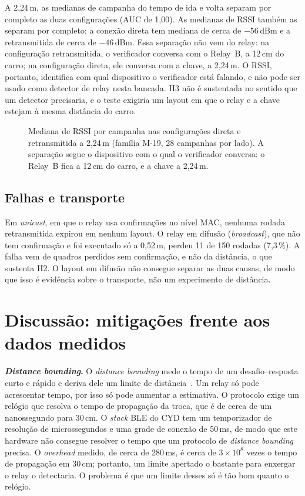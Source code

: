 \documentclass{ieeeaccess}
\begin{document}
A 2,24\,m, as medianas de campanha do tempo de ida e volta separam por completo as duas configurações (AUC de 1,00). As medianas de RSSI também as separam por completo: a conexão direta tem mediana de cerca de $-56$\,dBm e a retransmitida de cerca de $-46$\,dBm. Essa separação não vem do relay: na configuração retransmitida, o verificador conversa com o Relay~B, a 12\,cm do carro; na configuração direta, ele conversa com a chave, a 2,24\,m. O RSSI, portanto, identifica com qual dispositivo o verificador está falando, e não pode ser usado como detector de relay nesta bancada. H3 não é sustentada no sentido que um detector precisaria, e o teste exigiria um layout em que o relay e a chave estejam à mesma distância do carro.

\begin{figure}[t]
\centering

\caption{Mediana de RSSI por campanha nas configurações direta e retransmitida a 2,24\,m (família M-19, 28 campanhas por lado). A separação segue o dispositivo com o qual o verificador conversa: o Relay~B fica a 12\,cm do carro, e a chave a 2,24\,m.}
\label{fig:rssi}
\end{figure}

\subsection{Falhas e transporte}

Em \emph{unicast}, em que o relay usa confirmações no nível MAC, nenhuma rodada retransmitida expirou em nenhum layout. O relay em difusão (\emph{broadcast}), que não tem confirmação e foi executado só a 0,52\,m, perdeu 11 de 150 rodadas (7,3\,\%). A falha vem de quadros perdidos sem confirmação, e não da distância, o que sustenta H2. O layout em difusão não consegue separar as duas causas, de modo que isso é evidência sobre o transporte, não um experimento de distância.

\section{Discussão: mitigações frente aos dados medidos}
\label{sec:discussion}

\textbf{\emph{Distance bounding}.} O \emph{distance bounding} mede o tempo de um desafio--resposta curto e rápido e deriva dele um limite de distância~\cite{b16,b27,b28}. Um relay só pode acrescentar tempo, por isso só pode aumentar a estimativa. O protocolo exige um relógio que resolva o tempo de propagação da troca, que é de cerca de um nanossegundo para 30\,cm. O \emph{stack} BLE do CYD tem um temporizador de resolução de microssegundos e uma grade de conexão de 50\,ms, de modo que este hardware não consegue resolver o tempo que um protocolo de \emph{distance bounding} precisa. O \emph{overhead} medido, de cerca de 280\,ms, é cerca de $3\times10^{8}$ vezes o tempo de propagação em 30\,cm; portanto, um limite apertado o bastante para enxergar o relay o detectaria. O problema é que um limite desses só é tão bom quanto o relógio.
\end{document}
